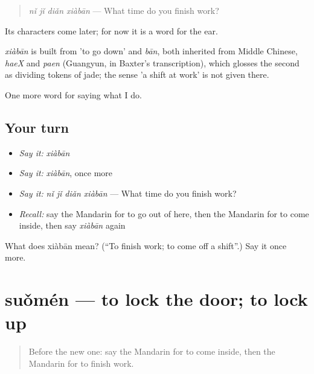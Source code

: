 \begin{quote}
\emph{nǐ jǐ diǎn xiàbān} — What time do you finish work?
\end{quote}

Its characters come later; for now it is a word for the ear.

\begin{cousinweb}
\emph{xiàbān} is built from  'to go down' and \emph{bān}, both inherited from Middle Chinese, \emph{haeX} and \emph{paen} (Guangyun, in Baxter's transcription), which glosses the second as dividing tokens of jade; the sense 'a shift at work' is not given there.
\end{cousinweb}

\begin{grammarlens}[title={What you've built}]
One more word for saying what I do.
\end{grammarlens}

\subsection*{Your turn}
\begin{itemize}
\raggedright
  \item \emph{Say it:} \emph{xiàbān}
  \item \emph{Say it:} \emph{xiàbān}, once more
  \item \emph{Say it:} \emph{nǐ jǐ diǎn xiàbān} — What time do you finish work?
  \item \emph{Recall:} say the Mandarin for to go out of here, then the Mandarin for to come inside, then say \emph{xiàbān} again
\end{itemize}

\begin{tcolorbox}[breakable,colback=teal!4,colframe=teal!35!black,title={Before you move on}]
What does xiàbān mean? (\textquotedblleft{}To finish work; to come off a shift\textquotedblright{}.) Say it once more.
\end{tcolorbox}
\section[suǒmén]{suǒmén — to lock the door; to lock up}

\label{lesson:ZH-C183-suomen}



\begin{quote}
Before the new one: say the Mandarin for to come inside, then the Mandarin for to finish work.
\end{quote}

